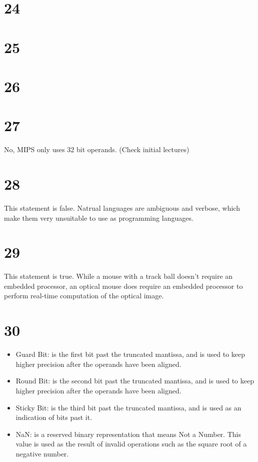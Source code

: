 \documentclass[a4paper,11pt]{article}
\begin{document}
\section*{24}


\section*{25}


\section*{26}


\section*{27}
No, MIPS only uses 32 bit operands.  (Check initial lectures)


\section*{28}
This statement is false.  Natrual languages are ambiguous and verbose, which make them very unsuitable to use as programming languages.


\section*{29}
This statement is true.  While a mouse with a track ball doesn't require an embedded processor, an optical mouse does require an embedded processor to perform real-time computation of the optical image. 


\section*{30}
\begin{itemize}
  \item Guard Bit:  is the first bit past the truncated mantissa, and is used to keep higher precision after the operands have been aligned.
  \item Round Bit: is the second bit past the truncated mantissa, and is used to keep higher precision after the operands have been aligned.
  \item Sticky Bit: is the third bit past the truncated mantissa, and is used as an indication of bits past it.
  \item NaN: is a reserved binary representation that means Not a Number.  This value is used as the result of invalid operations such as the square root of a negative number.
\end{itemize}
\end{document}
